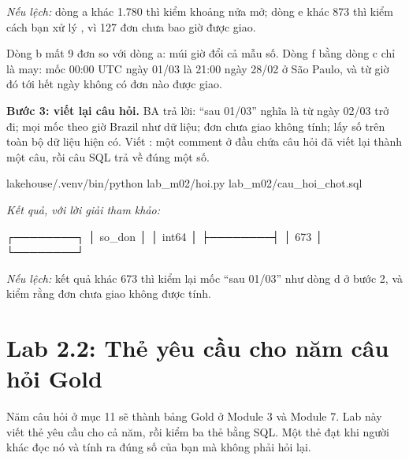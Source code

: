 \textit{Nếu lệch:} dòng a khác 1.780 thì kiểm khoảng nửa mở; dòng e khác 873 thì kiểm cách bạn xử lý , vì 127 đơn chưa bao giờ được giao.

Dòng b mất 9 đơn so với dòng a: múi giờ đổi cả mẫu số. Dòng f bằng dòng c chỉ là may: mốc 00:00 UTC ngày 01/03 là 21:00 ngày 28/02 ở São Paulo, và từ giờ đó tới hết ngày không có đơn nào được giao.

\textbf{Bước 3: viết lại câu hỏi.} BA trả lời: ``sau 01/03'' nghĩa là từ ngày 02/03 trở đi; mọi mốc theo giờ Brazil như dữ liệu; đơn chưa giao không tính; lấy số trên toàn bộ dữ liệu hiện có. Viết : một comment ở đầu chứa câu hỏi đã viết lại thành một câu, rồi câu SQL trả về đúng một số.

\begin{codeblock}
lakehouse/.venv/bin/python lab_m02/hoi.py lab_m02/cau_hoi_chot.sql
\end{codeblock}
\textit{Kết quả, với lời giải tham khảo:}
\begin{codeblock}
┌────────┐
│ so_don │
│ int64  │
├────────┤
│    673 │
└────────┘
\end{codeblock}

\textit{Nếu lệch:} kết quả khác 673 thì kiểm lại mốc ``sau 01/03'' như dòng d ở bước 2, và kiểm rằng đơn chưa giao không được tính.


\section{Lab 2.2: Thẻ yêu cầu cho năm câu hỏi Gold}

Năm câu hỏi ở  mục 11 sẽ thành bảng Gold ở Module 3 và Module 7. Lab này viết thẻ yêu cầu cho cả năm, rồi kiểm ba thẻ bằng SQL. Một thẻ đạt khi người khác đọc nó và tính ra đúng số của bạn mà không phải hỏi lại.

